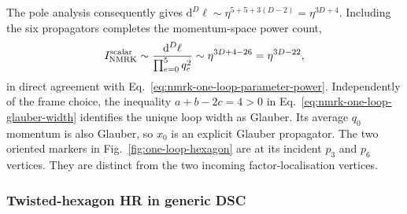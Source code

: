\documentclass[a4paper,11pt]{article}
\newcommand{\dd}{\mathrm d}
\begin{document}
The pole analysis consequently gives
\(\dd^D\ell\sim\eta^{5+5+3(D-2)}=\eta^{3D+4}\).  Including the six
propagators completes the momentum-space power count,
\[
 I_{\mathrm{NMRK}}^{\rm scalar}
 \sim\frac{\dd^D\ell}{\prod_{e=0}^{5}q_e^2}
 \sim\eta^{3D+4-26}=\eta^{3D-22},
\]
in direct agreement with Eq.~\eqref{eq:nmrk-one-loop-parameter-power}.
Independently of the frame choice, the inequality
\(a+b-2c=4>0\) in Eq.~\eqref{eq:nmrk-one-loop-glauber-width} identifies the
unique loop width as Glauber.  Its average \(q_0\) momentum is also Glauber,
so \(x_0\) is an explicit Glauber propagator.  The two oriented markers in
Fig.~\ref{fig:one-loop-hexagon} are at its incident \(p_3\) and \(p_6\)
vertices.  They are distinct from the two incoming factor-localisation
vertices.

\subsubsection{Twisted-hexagon HR in generic DSC}
\end{document}

